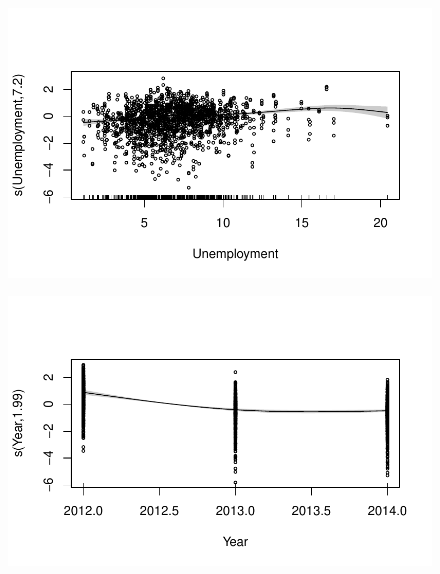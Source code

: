 \documentclass[
  letterpaper,
  DIV=11,
  numbers=noendperiod]{scrartcl}
\begin{document}
\begin{figure}[H]

{\centering \includegraphics{Group34Coursework_files/figure-pdf/unnamed-chunk-15-7.pdf}

}

\end{figure}

\begin{figure}[H]

{\centering \includegraphics{Group34Coursework_files/figure-pdf/unnamed-chunk-15-8.pdf}

}

\end{figure}
\end{document}
